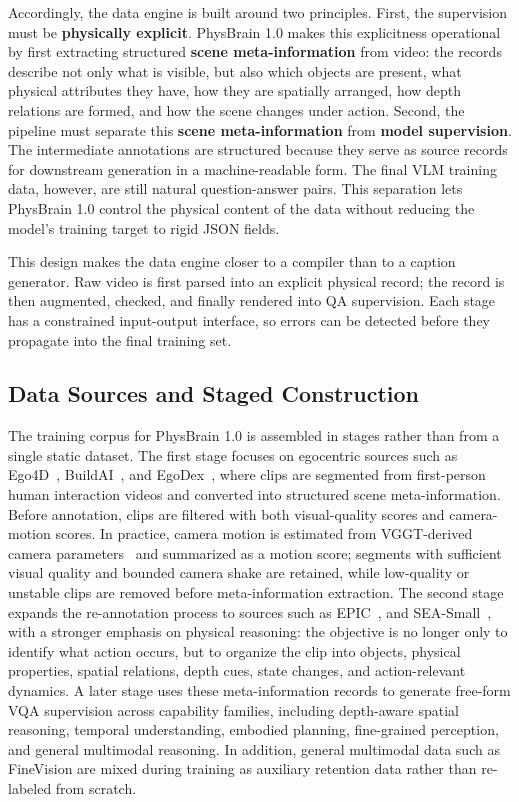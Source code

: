 \documentclass{llmxive}
\providecommand{\todo}[1]{}
\begin{document}
Accordingly, the data engine is built around two principles. First, the supervision must be \textbf{physically explicit}. PhysBrain 1.0 makes this explicitness operational by first extracting structured \textbf{scene meta-information} from video: the records describe not only what is visible, but also which objects are present, what physical attributes they have, how they are spatially arranged, how depth relations are formed, and how the scene changes under action. Second, the pipeline must separate this \textbf{scene meta-information} from \textbf{model supervision}. The intermediate annotations are structured because they serve as source records for downstream generation in a machine-readable form. The final VLM training data, however, are still natural question-answer pairs. This separation lets PhysBrain 1.0 control the physical content of the data without reducing the model's training target to rigid JSON fields.

This design makes the data engine closer to a compiler than to a caption generator. Raw video is first parsed into an explicit physical record; the record is then augmented, checked, and finally rendered into QA supervision. Each stage has a constrained input-output interface, so errors can be detected before they propagate into the final training set.

\subsection{Data Sources and Staged Construction}

The training corpus for PhysBrain 1.0 is assembled in stages rather than from a single static dataset. The first stage focuses on egocentric sources such as Ego4D~\cite{Ego4D_2022_CVPR}, BuildAI~\cite{buildaiegocentric10k2025}, and EgoDex~\cite{EgoDex_2025_arXiv}, where clips are segmented from first-person human interaction videos and converted into structured scene meta-information. Before annotation, clips are filtered with both visual-quality scores and camera-motion scores. In practice, camera motion is estimated from VGGT-derived camera parameters~\cite{VGGT_2025_CVPR} and summarized as a motion score; segments with sufficient visual quality and bounded camera shake are retained, while low-quality or unstable clips are removed before meta-information extraction. The second stage expands the re-annotation process to sources such as EPIC~\cite{damen2020epic}, and SEA-Small~\cite{spatial_ai_sea_small}, with a stronger emphasis on physical reasoning: the objective is no longer only to identify what action occurs, but to organize the clip into objects, physical properties, spatial relations, depth cues, state changes, and action-relevant dynamics. A later stage uses these meta-information records to generate free-form VQA supervision across capability families, including depth-aware spatial reasoning, temporal understanding, embodied planning, fine-grained perception, and general multimodal reasoning. In addition, general multimodal data such as FineVision are mixed during training as auxiliary retention data rather than re-labeled from scratch.
\end{document}
